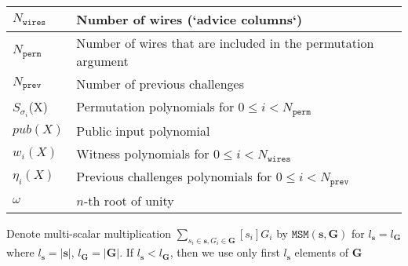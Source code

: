 \begin{center}
    \begin{table}[H]
        \begin{tabular}{| l | l |}
            \hline
            $N_{\texttt{wires}}$ & Number of wires (`advice columns`)                                 \\
            \hline
            $N_{\texttt{perm}}$   & Number of wires that are included in the permutation argument      \\
            \hline
            $N_{\texttt{prev}}$   & Number of previous challenges                                      \\
            \hline
            $S_{\sigma_i}$(X)     & Permutation polynomials for $0 \leq i < N_{\texttt{perm}}$         \\
            \hline
            $pub(X)$              & Public input polynomial                                            \\
            \hline
            $w_i(X)$              & Witness polynomials for $0 \leq i < N_{\texttt{wires}}$            \\
            \hline
            $\eta_i(X)$           & Previous challenges polynomials for $0 \leq i < N_{\texttt{prev}}$ \\
            \hline
            $\omega$              & $n$-th root of unity                                               \\
            \hline
        \end{tabular}
    \end{table}
\end{center}

Denote multi-scalar multiplication $\sum_{s_i \in \textbf{s}, G_i \in \textbf{G}}[s_i]G_i$ by $\texttt{MSM}(\textbf{s}, \textbf{G})$ for $l_{\textbf{s}} = l_{\textbf{G}}$ where $l_{\textbf{s}} = |\textbf{s}|$, $l_{\textbf{G}} = |\textbf{G}|$.
If $l_{\textbf{s}} < l_{\textbf{G}}$, then we use only first $l_{\textbf{s}}$ elements of $\textbf{G}$

